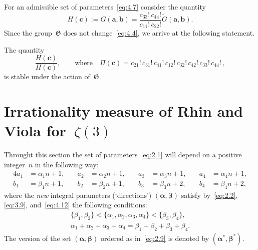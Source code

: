 \documentclass[a4paper,twoside]{article}
\numberwithin{equation}{section}
\renewcommand{\[}{\lfloor}
\renewcommand{\]}{\rfloor}
\newcommand{\<}{\langle}
\renewcommand{\>}{\rangle}
\newcommand{\wt}{\widetilde}
\newcommand{\ba}{\boldsymbol a}
\newcommand{\bb}{\boldsymbol b}
\newcommand{\bc}{\boldsymbol c}
\newcommand{\balpha}{\boldsymbol\alpha}
\newcommand{\bbeta}{\boldsymbol\beta}
\newcommand{\fG}{\mathfrak G}
\begin{document}
For an admissible set of parameters~\eqref{eq:4.7} consider
the quantity
\begin{equation}
H(\bc):=G(\ba,\bb)
=\frac{c_{33}!\,c_{44}!}{c_{11}!\,c_{22}!}\wt G(\ba,\bb).
\label{eq:4.13}
\end{equation}
Since the group~$\fG$ does not change~\eqref{eq:4.4},
we arrive at the following statement.

\begin{lemma}
\label{lem:9}
The quantity
\begin{equation}
\frac{H(\bc)}{\varPi(\bc)},
\qquad\mbox{where}\quad
\varPi(\bc)=c_{21}!\,c_{31}!\,c_{41}!\,
c_{12}!\,c_{32}!\,c_{42}!\,c_{33}!\,c_{44}!\,,
\label{eq:4.14}
\end{equation}
is stable under the action of~$\fG$.
\end{lemma}

\section{Irrationality measure of Rhin and Viola for~$\zeta(3)$}
\label{sec:5}
Throught this section the set of parameters~\eqref{eq:2.1}
will depend on a positive integer~$n$ in the following way:
\begin{equation}
\begin{alignedat}{4}{4}
a_1&=\alpha_1n+1, \quad&
a_2&=\alpha_2n+1, \quad&
a_3&=\alpha_3n+1, \quad&
a_4&=\alpha_4n+1,
\\
b_1&=\beta_1n+1, \quad&
b_2&=\beta_2n+1, \quad&
b_3&=\beta_3n+2, \quad&
b_4&=\beta_4n+2,
\end{alignedat}
\label{eq:5.1}
\end{equation}
where the {\it new\/} integral parameters
(`directions') $(\balpha,\bbeta)$
satisfy by~\eqref{eq:2.2}, \eqref{eq:3.9}, and~\eqref{eq:4.12}
the following conditions:
\begin{gather}
\{\beta_1,\beta_2\}
<\{\alpha_1,\alpha_2,\alpha_3,\alpha_4\}
<\{\beta_3,\beta_4\},
\label{eq:5.2}
\\
\alpha_1+\alpha_2+\alpha_3+\alpha_4
=\beta_1+\beta_2+\beta_3+\beta_4.
\label{eq:5.3}
\end{gather}
The version of the set $(\balpha,\bbeta)$ ordered as in~\eqref{eq:2.9}
is denoted by $(\balpha^*,\bbeta^*)$.
\end{document}
